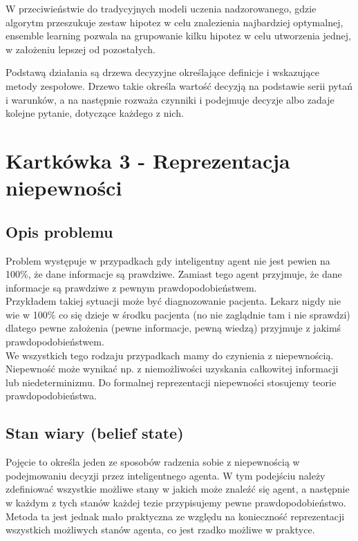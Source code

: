 \documentclass[a4paper,15pt]{article}
\begin{document}
W przeciwieństwie do tradycyjnych modeli uczenia nadzorowanego, gdzie algorytm przeszukuje zestaw hipotez w celu znalezienia najbardziej optymalnej, ensemble learning pozwala na grupowanie kilku hipotez w celu utworzenia jednej, w założeniu lepszej od pozostałych.

Podstawą działania są drzewa decyzyjne określające definicje i wskazujące metody zespołowe. Drzewo takie określa wartość decyzją na podstawie serii pytań i warunków, a na następnie rozważa czynniki i podejmuje decyzje albo zadaje kolejne pytanie, dotyczące każdego z nich. 


\newpage
\section{Kartkówka 3 - Reprezentacja niepewności}

\subsection{Opis problemu}

Problem występuje w przypadkach gdy inteligentny agent nie jest pewien na 100\%, że dane informacje są prawdziwe. Zamiast tego agent przyjmuje, że dane informacje są prawdziwe z pewnym prawdopodobieństwem. \\

Przykładem takiej sytuacji może być diagnozowanie pacjenta. Lekarz nigdy nie wie w 100\% co się dzieje w środku pacjenta (no nie zaglądnie tam i nie sprawdzi) dlatego pewne założenia (pewne informacje, pewną wiedzą) przyjmuje z jakimś prawdopodobieństwem. \\



We wszystkich tego rodzaju przypadkach mamy do czynienia z niepewnością. Niepewność może wynikać np. z niemożliwości uzyskania całkowitej informacji lub niedeterminizmu. Do formalnej reprezentacji niepewności stosujemy teorie prawdopodobieństwa. 
 

\subsection{Stan wiary (belief state)}
Pojęcie to określa jeden ze sposobów radzenia sobie z niepewnością w podejmowaniu decyzji przez inteligentnego agenta. W tym podejściu należy zdefiniować wszystkie możliwe stany w jakich może znaleźć się agent, a następnie w każdym z tych stanów każdej tezie przypisujemy pewne prawdopodobieństwo. Metoda ta jest jednak mało praktyczna ze względu na konieczność reprezentacji wszystkich możliwych stanów agenta, co jest rzadko możliwe w praktyce. 
\end{document}
